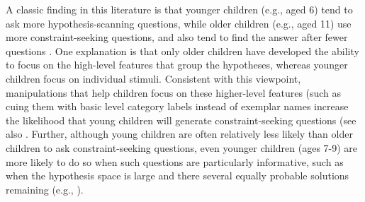 \documentclass[10pt,letterpaper]{article}
\begin{document}
A classic finding
in this literature is that younger children (e.g., aged 6) tend to ask more hypothesis-scanning questions, 
while older children (e.g., aged 11) use more constraint-seeking  questions, and also 
tend to find the answer after fewer questions \cite{Mosher:1966}. 
One explanation is that only older children have developed the ability to focus on the 
high-level features that group the hypotheses, whereas younger children focus on 
individual stimuli.
Consistent with this viewpoint, manipulations that help children focus on these higher-level features (such as cuing them with basic
level category labels instead of exemplar names 
 increase the likelihood that young children will generate constraint-seeking questions (see also  .
Further, although young children are often relatively less likely than older children to ask constraint-seeking questions, even younger children (ages 7-9) are 
more likely to do so when such questions are particularly informative, such as when the hypothesis space is large and there several equally probable solutions remaining (e.g.,  ).
\end{document}
